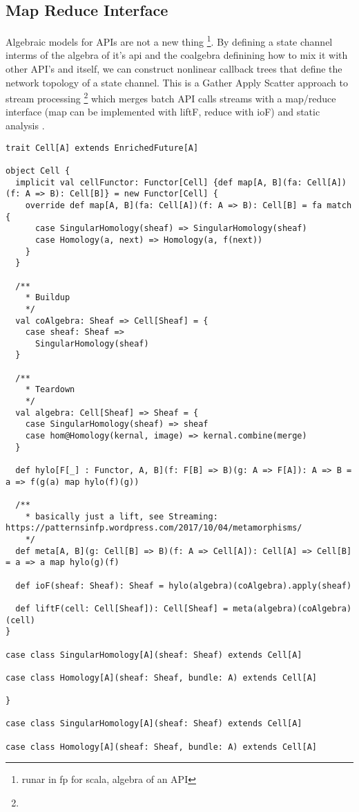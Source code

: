 \documentclass{article}
\begin{document}
\subsection{Map Reduce Interface} 
Algebraic models for APIs are not a new thing \footnote{runar in fp for scala, algebra of an API}. By defining a state channel interms of the algebra of it's api and the coalgebra definining how to mix it with other API's and itself, we can construct nonlinear callback trees that define the network topology of a state channel. This is a Gather Apply Scatter approach to stream processing \footnote{} which merges batch API calls streams with a map/reduce interface (map can be implemented with liftF, reduce with ioF) and static analysis . 
\begin{lstlisting}[style=myScalastyle]
trait Cell[A] extends EnrichedFuture[A]

object Cell {
  implicit val cellFunctor: Functor[Cell] {def map[A, B](fa: Cell[A])(f: A => B): Cell[B]} = new Functor[Cell] {
    override def map[A, B](fa: Cell[A])(f: A => B): Cell[B] = fa match {
      case SingularHomology(sheaf) => SingularHomology(sheaf)
      case Homology(a, next) => Homology(a, f(next))
    }
  }

  /**
    * Buildup
    */
  val coAlgebra: Sheaf => Cell[Sheaf] = {
    case sheaf: Sheaf =>
      SingularHomology(sheaf)
  }

  /**
    * Teardown
    */
  val algebra: Cell[Sheaf] => Sheaf = {
    case SingularHomology(sheaf) => sheaf
    case hom@Homology(kernal, image) => kernal.combine(merge)
  }

  def hylo[F[_] : Functor, A, B](f: F[B] => B)(g: A => F[A]): A => B = a => f(g(a) map hylo(f)(g))

  /**
    * basically just a lift, see Streaming: https://patternsinfp.wordpress.com/2017/10/04/metamorphisms/
    */
  def meta[A, B](g: Cell[B] => B)(f: A => Cell[A]): Cell[A] => Cell[B] = a => a map hylo(g)(f)

  def ioF(sheaf: Sheaf): Sheaf = hylo(algebra)(coAlgebra).apply(sheaf)

  def liftF(cell: Cell[Sheaf]): Cell[Sheaf] = meta(algebra)(coAlgebra)(cell)
}

case class SingularHomology[A](sheaf: Sheaf) extends Cell[A]

case class Homology[A](sheaf: Sheaf, bundle: A) extends Cell[A]

}

case class SingularHomology[A](sheaf: Sheaf) extends Cell[A]

case class Homology[A](sheaf: Sheaf, bundle: A) extends Cell[A]
\end{lstlisting}
\end{document}
